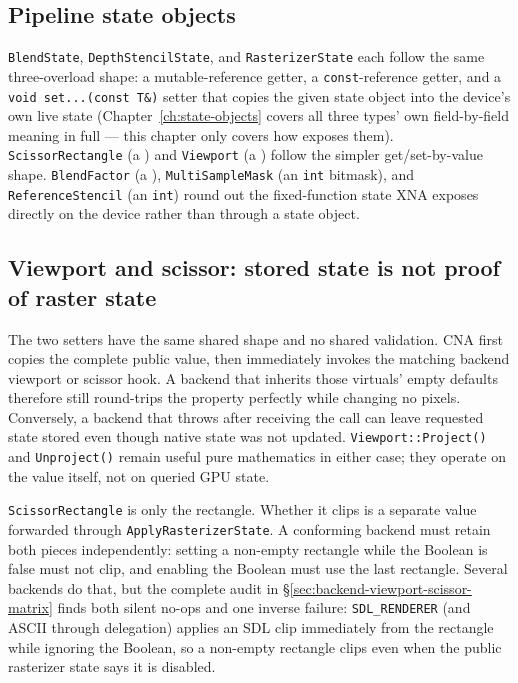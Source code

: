 \subsection{Pipeline state objects}

\texttt{BlendState}, \texttt{DepthStencilState}, and \texttt{RasterizerState} each follow the
same three-overload shape: a mutable-reference getter, a \texttt{const}-reference getter, and a
\texttt{void set...(const T\&)} setter that copies the given state object into the device's own
live state (Chapter~\ref{ch:state-objects} covers all three types' own field-by-field meaning
in full --- this chapter only covers how  exposes them).
\texttt{ScissorRectangle} (a ) and \texttt{Viewport} (a )
follow the simpler get/set-by-value shape. \texttt{BlendFactor} (a ),
\texttt{MultiSampleMask} (an \texttt{int} bitmask), and \texttt{ReferenceStencil} (an
\texttt{int}) round out the fixed-function state XNA exposes directly on the device rather than
through a state object.

\subsection{Viewport and scissor: stored state is not proof of raster state}
\label{sec:graphicsdevice-viewport-scissor}

The two setters have the same shared shape and no shared validation. CNA first copies the
complete public value, then immediately invokes the matching backend viewport or scissor
hook. A backend that inherits those virtuals' empty defaults therefore still
round-trips the property perfectly while changing no pixels. Conversely, a backend that throws
after receiving the call can leave requested state stored even though native state was not
updated. \texttt{Viewport::Project()} and \texttt{Unproject()} remain useful pure mathematics in
either case; they operate on the  value itself, not on queried GPU state.

\texttt{ScissorRectangle} is only the rectangle. Whether it clips is a separate
 value forwarded through
\texttt{ApplyRasterizerState}. A conforming backend must retain both pieces independently:
setting a non-empty rectangle while the Boolean is false must not clip, and enabling the
Boolean must use the last rectangle. Several backends do that, but the complete audit in
\S\ref{sec:backend-viewport-scissor-matrix} finds both silent no-ops and one inverse failure:
\texttt{SDL\_RENDERER} (and ASCII through delegation) applies an SDL clip immediately from the
rectangle while ignoring the Boolean, so a non-empty rectangle clips even when the public
rasterizer state says it is disabled.

